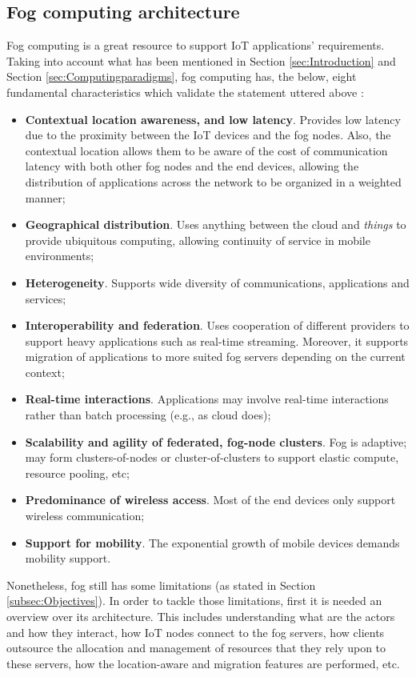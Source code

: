 \subsection{Fog computing architecture}
Fog computing is a great resource to support IoT applications' requirements. Taking into account what has been mentioned in Section \ref{sec:Introduction} and Section \ref{sec:Computingparadigms}, fog computing has, the below, eight fundamental characteristics which validate the statement uttered above \cite{iorga2018fog}:
\begin{itemize}
	\item \textbf{Contextual location awareness, and low latency}. Provides low latency due to the proximity between the IoT devices and the fog nodes. Also, the contextual location allows them to be aware of the cost of communication latency with both other fog nodes and the end devices, allowing the distribution of applications across the network to be organized in a weighted manner;
	\item \textbf{Geographical distribution}. Uses anything between the cloud and \textit{things} to provide ubiquitous computing, allowing continuity of service in mobile environments;
	\item \textbf{Heterogeneity}. Supports wide diversity of communications, applications and services;
	\item \textbf{Interoperability and federation}. Uses cooperation of different providers to support heavy applications such as real-time streaming. Moreover, it supports migration of applications to more suited fog servers depending on the current context;
	\item \textbf{Real-time interactions}. Applications may involve real-time interactions rather than batch processing (e.g., as cloud does);
	\item \textbf{Scalability and agility of federated, fog-node clusters}. Fog is adaptive; may form clusters-of-nodes or cluster-of-clusters to support elastic compute, resource pooling, etc;
	\item \textbf{Predominance of wireless access}. Most of the end devices only support wireless communication;
	\item \textbf{Support for mobility}. The exponential growth of mobile devices demands mobility support.
\end{itemize}

Nonetheless, fog still has some limitations (as stated in Section \ref{subsec:Objectives}). In order to tackle those limitations, first it is needed an overview over its architecture. This includes understanding what are the actors and how they interact, how IoT nodes connect to the fog servers, how clients outsource the allocation and management of resources that they rely upon to these servers, how the location-aware and migration features are performed, etc.

